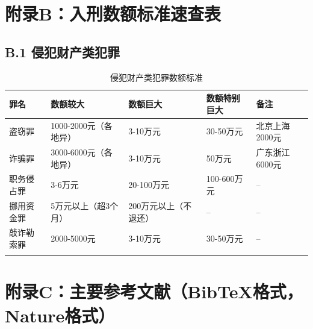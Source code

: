 \documentclass[12pt,a4paper]{article}
\begin{document}
\clearpage

\section{附录B：入刑数额标准速查表}

\subsection{B.1 侵犯财产类犯罪}

\begin{longtable}{p{3cm}p{3cm}p{3cm}p{3cm}p{2cm}}
  \toprule
  \textbf{罪名} & \textbf{数额较大} & \textbf{数额巨大} & \textbf{数额特别巨大} & \textbf{备注} \\
  \midrule
  盗窃罪 & 1000-2000元（各地异） & 3-10万元 & 30-50万元 & 北京上海2000元 \\
  诈骗罪 & 3000-6000元（各地异） & 3-10万元 & 50万元 & 广东浙江6000元 \\
  职务侵占罪 & 3-6万元 & 20-100万元 & 100-600万元 & -- \\
  挪用资金罪 & 5万元以上（超3个月） & 200万元以上（不退还） & -- & -- \\
  敲诈勒索罪 & 2000-5000元 & 3-10万元 & 30-50万元 & -- \\
  \bottomrule
  \caption{侵犯财产类犯罪数额标准}
\end{longtable}

\clearpage

\section{附录C：主要参考文献（BibTeX格式，Nature格式）}
\end{document}

